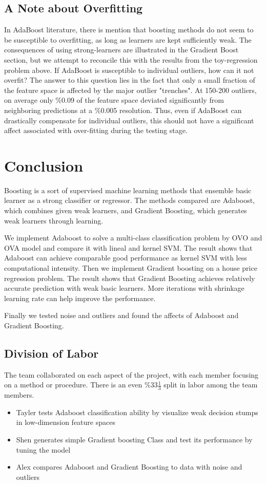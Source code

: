 \documentclass[10pt,twocolumn,letterpaper]{article}
\begin{document}
\subsection{A Note about Overfitting} 
In AdaBoost literature, there is mention that boosting methods do not seem to be susceptible to overfitting, as long as learners are kept sufficiently weak. \cite{schapire2012boosting} The consequences of using strong-learners are illustrated in the Gradient Boost section, but we attempt to reconcile this with the results from the toy-regression problem above. If AdaBoost is susceptible to individual outliers, how can it not overfit? The answer to this question lies in the fact that only a small fraction of the feature space is affected by the major outlier "trenches". At 150-200 outliers, on average only \%0.09 of the feature space deviated significantly from neighboring predictions at a \%0.005 resolution. Thus, even if AdaBoost can drastically compensate for individual outliers, this should not have a significant affect associated with over-fitting during the testing stage. 

\section{Conclusion}
Boosting is a sort of supervised machine learning methods that ensemble basic learner as a strong classifier or regressor. The methods compared are Adaboost, which combines given weak learners, and Gradient Boosting, which generates weak learners through learning.

We implement Adaboost to solve a multi-class classification problem by OVO and OVA model and compare it with lineal and kernel SVM. The result shows that Adaboost can achieve comparable good performance as kernel SVM with less computational intensity. Then we implement Gradient boosting on a house price regression problem. The result shows that Gradient Boosting achieves relatively accurate prediction with weak basic learners. More iterations with shrinkage learning rate can help improve the performance.

Finally we tested noise and outliers and found the affects of Adaboost and Gradient Boosting. 

\subsection{Division of Labor}
The team collaborated on each aspect of the project, with each member focusing on a method or procedure. There is an even $\%33\frac{1}{3}$ split in labor among the team members.
\begin{itemize}
\item   Tayler tests Adaboost classification ability by visualize weak decision stumps in low-dimension feature spaces
\item   Shen generates simple Gradient boosting Class and test its performance by tuning the model
\item   Alex compares Adaboost and Gradient Boosting to data with noise and outliers
\end{itemize}




\nocite{*}
\end{document}
